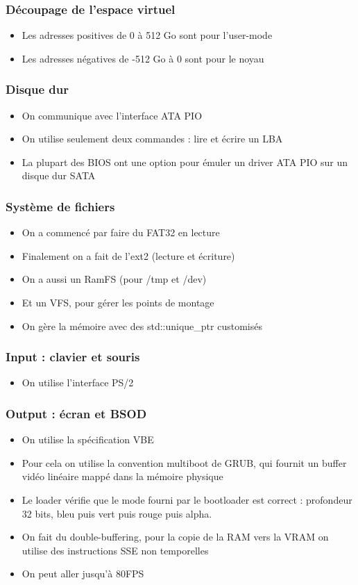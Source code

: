 \documentclass[aspectration=43]{beamer}
\begin{document}
\begin{frame}
    \frametitle{Découpage de l'espace virtuel}
    \begin{itemize}
        \item Les adresses positives de 0 à 512 Go sont pour l'user-mode
        \item Les adresses négatives de -512 Go à 0 sont pour le noyau
    \end{itemize}
\end{frame}

\begin{frame}
    \frametitle{Disque dur}
    \begin{itemize}
        \item On communique avec l'interface ATA PIO
        \item On utilise seulement deux commandes : lire et écrire un LBA
        \item La plupart des BIOS ont une option pour émuler un driver ATA PIO sur un disque dur SATA
    \end{itemize}
\end{frame}


\begin{frame}
    \frametitle{Système de fichiers}
    \begin{itemize}
        \item On a commencé par faire du FAT32 en lecture
        \item Finalement on a fait de l'ext2 (lecture et écriture)
        \item On a aussi un RamFS (pour /tmp et /dev)
        \item Et un VFS, pour gérer les points de montage
        \item On gère la mémoire avec des std::unique\_ptr customisés
    \end{itemize}
\end{frame}

\begin{frame}
    \frametitle{Input : clavier et souris}
    \begin{itemize}
        \item On utilise l'interface PS/2
    \end{itemize}
\end{frame}

\begin{frame}
    \frametitle{Output : écran et BSOD}
    \begin{itemize}
        \item On utilise la spécification VBE
        \item Pour cela on utilise la convention multiboot de GRUB, qui fournit un buffer vidéo linéaire mappé dans la mémoire physique
        \item Le loader vérifie que le mode fourni par le bootloader est correct : profondeur 32 bits, bleu puis vert puis rouge puis alpha.
        \item On fait du double-buffering, pour la copie de la RAM vers la VRAM on utilise des instructions SSE non temporelles
        \item On peut aller jusqu'à 80FPS
    \end{itemize}
\end{frame}
\end{document}
